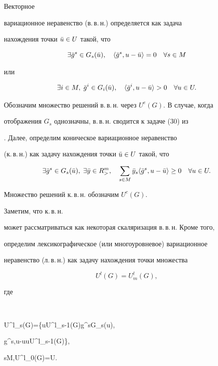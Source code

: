 Векторное


вариационное неравенство (в.\,в.\,н.) определяется как задача


нахождения точки $\Bar u\in U$ такой, что


$$


\exists\Bar g^s\in G_s(\Bar u),\quad


\la \Bar g^s,u-\Bar u\ra=0\quad \forall s\in M


$$


или


$$


\exists i\in M,\; \Bar g^i\in G_i(\Bar u),\quad


\la\Bar g^i,u-\Bar u\ra>0\quad \forall u\in U.


$$


Обозначим множество решений в.\,в.\,н. через $U^e(G)$. В случае, когда


отображения $G_s$ однозначны, в.\,в.\,н. сводится к задаче (30) из


\cite{Gia}. Далее, определим коническое вариационное неравенство


(к.\,в.\,н.) как задачу нахождения точки $\Bar u\in U$ такой, что


$$


\exists\Bar g^s\in G_s(\Bar u),\;\exists\Bar y\in R^m_{>},\quad


\sum_{s\in M}\Bar y_s\la\Bar g^s,u-\Bar u\ra\ge 0\quad


\forall u\in U.


$$


Множество решений к.\,в.\,н. обозначим $U^c(G)$.


Заметим, что к.\,в.\,н.


может рассматриваться как некоторая скаляризация в.\,в.\,н. Кроме того,


определим лексикографическое (или многоуровневое) вариационное


неравенство (л.\,в.\,н.) как задачу нахождения точки множества


$$


U^l(G)=U^l_m(G),


$$


где


$$


U^l_s(G)=\{\Bar u\in U^l_{s-1}(G)\mid\exists\Bar g^s\in G_s(\Bar u),


\; \la\Bar g^s,u-\Bar u\ra{}\;\forall u\in U^l_{s-1}(G)\},


\quad s\in M,\quad U^l_0(G)=U.


